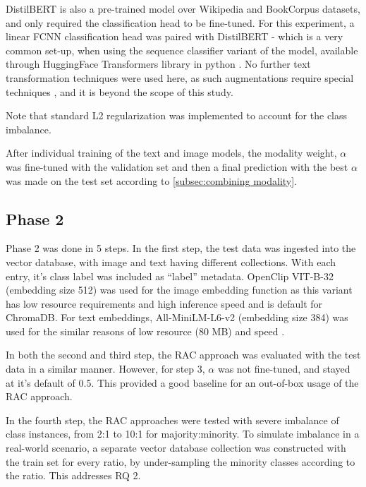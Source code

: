 \documentclass{article}
\begin{document}
DistilBERT is also a pre-trained model over Wikipedia \cite{wikidump} and BookCorpus \cite{Zhu_2015_ICCV} datasets, and only required the classification head to be fine-tuned. For this experiment, a linear FCNN classification head was paired with DistilBERT - which is a very common set-up, when using the sequence classifier variant of the model, available through HuggingFace Transformers library in python \cite{huggingface_distilbert}. No further text transformation techniques were used here, as such augmentations require special techniques \cite{bayer2022survey}, and it is beyond the scope of this study. 

Note that standard L2 regularization was implemented to account for the class imbalance.

After individual training of the text and image models, the modality weight, $\alpha$ was fine-tuned with the validation set and then a final prediction with the best $\alpha$ was made on the test set according to \autoref{subsec:combining modality}. 

\subsection{Phase 2}

Phase 2 was done in 5 steps. In the first step, the test data was ingested into the vector database, with image and text having different collections. With each entry, it's class label was included as ``label'' metadata. OpenClip VIT-B-32 (embedding size 512) was used for the image embedding function as this variant has low resource requirements and high inference speed \cite{cazarin2025multimodal, chen2025standalone} and is default for ChromaDB. For text embeddings, All-MiniLM-L6-v2 (embedding size 384) was used for the similar reasons of low resource (80 MB) and speed \cite{abimbola2026open}. 

In both the second and third step, the RAC approach was evaluated with the test data in a similar manner. However, for step 3, $\alpha$ was not fine-tuned, and stayed at it's default of 0.5. This provided a good baseline for an out-of-box usage of the RAC approach.

In the fourth step, the RAC approaches were tested with severe imbalance of class instances, from 2:1 to 10:1 for majority:minority. To simulate imbalance in a real-world scenario, a separate vector database collection was constructed with the train set for every ratio, by under-sampling the minority classes according to the ratio. This addresses RQ 2.
\end{document}
